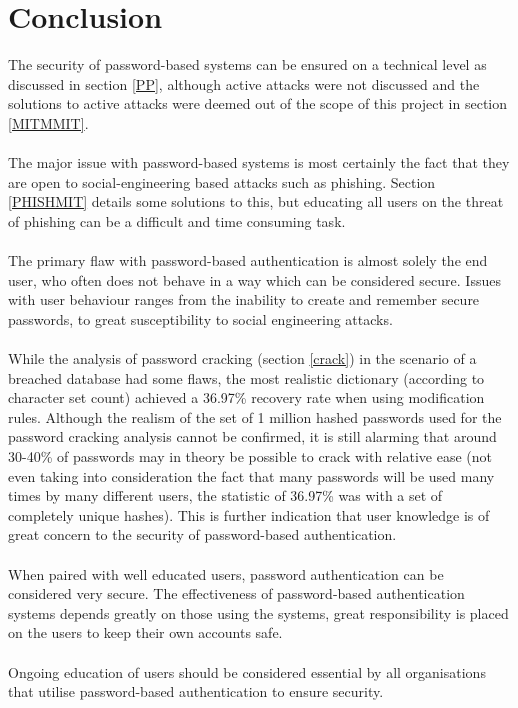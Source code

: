 \documentclass[11pt]{article}
\begin{document}
\section{Conclusion} \label{CONCL}
The security of password-based systems can be ensured on a technical level as discussed in section \ref{PP}, although active attacks were not discussed and the solutions to active attacks were deemed out of the scope of this project in section \ref{MITMMIT}.\\\\
The major issue with password-based systems is most certainly the fact that they are open to social-engineering based attacks such as phishing. Section \ref{PHISHMIT} details some solutions to this, but educating all users on the threat of phishing can be a difficult and time consuming task.\\\\
The primary flaw with password-based authentication is almost solely the end user, who often does not behave in a way which can be considered secure.
Issues with user behaviour ranges from the inability to create and remember secure passwords, to great susceptibility to social engineering attacks.\\\\
While the analysis of password cracking (section \ref{crack}) in the scenario of a breached database had some flaws, the most realistic dictionary (according to character set count) achieved a 36.97\% recovery rate when using modification rules.
Although the realism of the set of 1 million hashed passwords used for the password cracking analysis cannot be confirmed, it is still alarming that around 30-40\% of passwords may in theory be possible to crack with relative ease (not even taking into consideration the fact that many passwords will be used many times by many different users, the statistic of 36.97\% was with a set of completely unique hashes). This is further indication that user knowledge is of great concern to the security of password-based authentication.\\\\
When paired with well educated users, password authentication can be considered very secure. The effectiveness of password-based authentication systems depends greatly on those using the systems, great responsibility is placed on the users to keep their own accounts safe.\\\\
Ongoing education of users should be considered essential by all organisations that utilise password-based authentication to ensure security.



\end{document}
